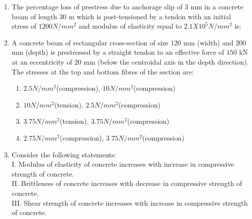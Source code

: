 \documentclass[journal]{IEEEtran}
\begin{document}
\begin{enumerate}[start=35]
	\begin{enumerate}
	\end{enumerate}
\item The percentage loss of prestress due to anchorage slip of $3$ mm in a concrete beam of length $30$ m which is post-tensioned by a tendon with an initial stress of $1200 N/mm^2$ and modulus of elasticity equal to $2.1 X 10^5 N/mm^2$ is: 
	\begin{enumerate}
			\begin{multicols}{4}
		\item $0.0175$
		\item $0.175$
		\item $1.75$
		\item $17.5$
			\end{multicols}
	\end{enumerate}
\item A concrete beam of rectangular cross-section of size $120$ mm (width) and $200$ mm (depth) is prestressed by a straight tendon to an effective force of $150$ kN at an eccentricity of $20$ mm (below the centroidal axis in the depth direction). The stresses at the top and bottom fibres of the section are:
	\begin{enumerate} 
			\item $2.5 N/mm^2$(compression), $10 N/mm^2$(compression)
			\item $10 N/mm^2$(tension), $2.5 N/mm^2$(compression)
			\item $3.75 N/mm^2$(tension), $3.75 N/mm^2$(compression)
			\item $2.75 N/mm^2$(compression), $3.75 N/mm^2$(compression)
			\end{enumerate}
\item Consider the following statements:\\
I. Modulus of elasticity of concrete increases with increase in compressive strength of concrete.\\
II. Brittleness of concrete increases with decrease in compressive strength of concrete.\\
III. Shear strength of concrete increases with increase in compressive strength of concrete.\\

\end{enumerate}
\end{document}
